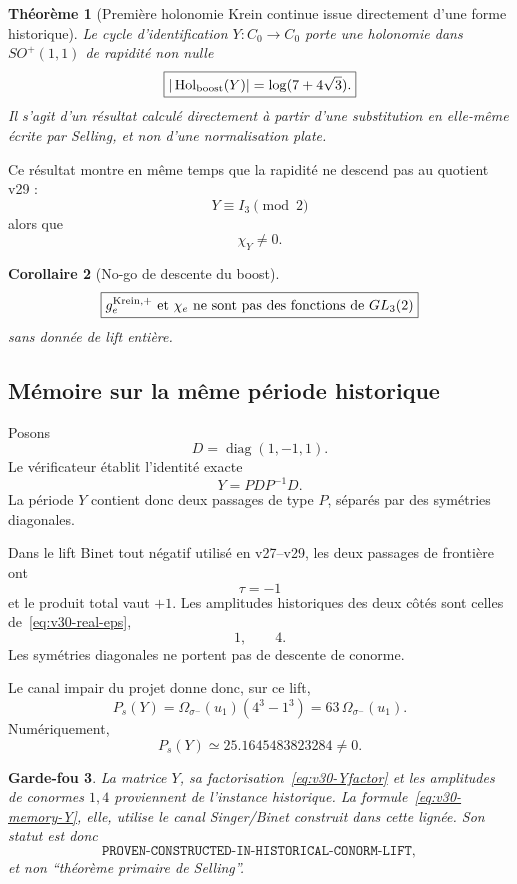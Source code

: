 \documentclass[11pt,a4paper]{article}
\newtheorem{theorem}{Théorème}[section]
\newtheorem{corollary}[theorem]{Corollaire}
\newtheorem{guardrail}[theorem]{Garde-fou}
\begin{document}
\begin{theorem}[Première holonomie Krein continue issue directement d'une forme historique]\label{thm:v30-real-historical-boost}
Le cycle d'identification $Y:C_0\to C_0$ porte une holonomie dans $SO^+(1,1)$ de rapidité non nulle
\[
 \boxed{
 |\operatorname{Hol}_{\rm boost}(Y)|
 =
 \log(7+4\sqrt3).}
\]
Il s'agit d'un résultat calculé directement à partir d'une substitution en elle-même écrite par Selling, et non d'une normalisation plate.
\end{theorem}

Ce résultat montre en même temps que la rapidité ne descend pas au quotient v29 :
\[
 Y\equiv I_3\pmod2
\]
alors que
\[
 \chi_Y\neq0.
\]

\begin{corollary}[No-go de descente du boost]\label{cor:v30-boost-not-descend}
\[
 \boxed{
 g_e^{\rm Krein,+}
 \text{ et }
 \chi_e
 \text{ ne sont pas des fonctions de }GL_3(2)
 }
\]
sans donnée de lift entière.
\end{corollary}

\subsection{Mémoire sur la même période historique}

Posons
\[
 D=\operatorname{diag}(1,-1,1).
\]
Le vérificateur établit l'identité exacte
\begin{equation}\label{eq:v30-Yfactor}
 \boxed{
 Y
 =
 P D P^{-1}D.}
\end{equation}
La période $Y$ contient donc deux passages de type $P$, séparés par des symétries diagonales.

Dans le lift Binet tout négatif utilisé en v27--v29, les deux passages de frontière ont
\[
 \tau=-1
\]
et le produit total vaut $+1$. Les amplitudes historiques des deux côtés sont celles de~\eqref{eq:v30-real-eps},
\[
 1,\qquad4.
\]
Les symétries diagonales ne portent pas de descente de conorme.

Le canal impair du projet donne donc, sur ce lift,
\begin{equation}\label{eq:v30-memory-Y}
 \boxed{
 P_s(Y)
 =
 \Omega_{\sigma^-}(u_1)
 \left(
 4^3-1^3
 \right)
 =
 63\,\Omega_{\sigma^-}(u_1).}
\end{equation}
Numériquement,
\[
 \boxed{
 P_s(Y)
 \simeq
 25.1645483823284
 \neq0.}
\]

\begin{guardrail}
La matrice $Y$, sa factorisation~\eqref{eq:v30-Yfactor} et les amplitudes de conormes $1,4$ proviennent de l'instance historique. La formule~\eqref{eq:v30-memory-Y}, elle, utilise le canal Singer/Binet construit dans cette lignée. Son statut est donc
\[
 \texttt{PROVEN-CONSTRUCTED-IN-HISTORICAL-CONORM-LIFT},
\]
et non ``théorème primaire de Selling''.
\end{guardrail}
\end{document}
